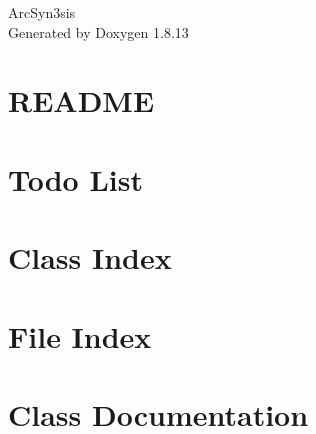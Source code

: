 \documentclass[twoside]{book}
\newcommand{\+}{\discretionary{\mbox{\scriptsize$\hookleftarrow$}}{}{}}
\newcommand{\clearemptydoublepage}{%
  \newpage{\pagestyle{empty}\cleardoublepage}%
}
\begin{document}
\hypersetup{pageanchor=false,
             bookmarksnumbered=true,
             pdfencoding=unicode
            }
\begin{titlepage}
\vspace*{7cm}
\begin{center}%
{\Large Arc\+Syn3sis }\\
\vspace*{1cm}
{\large Generated by Doxygen 1.8.13}\\
\end{center}
\end{titlepage}
\clearemptydoublepage
{}
\tableofcontents
\clearemptydoublepage
{}
\hypersetup{pageanchor=true}

\chapter{R\+E\+A\+D\+ME}
\label{a00767}

\chapter{Todo List}
\label{a00626}

\chapter{Class Index}

\chapter{File Index}

\chapter{Class Documentation}

































\end{document}
